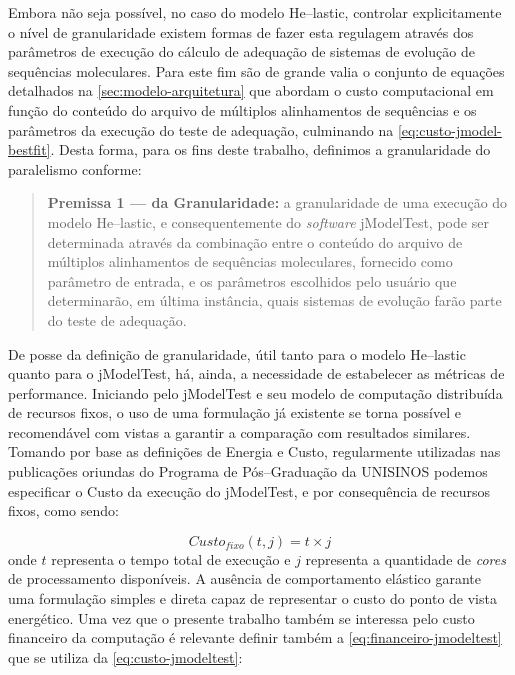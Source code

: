 \documentclass[english,brazilian]{UNISINOSmonografia} %
\begin{document}
Embora não seja possível, no caso do modelo \textsf{He}--lastic, controlar explicitamente o nível de granularidade existem formas de fazer esta regulagem através dos parâmetros de execução do cálculo de adequação de sistemas de evolução de sequências moleculares.
Para este fim são de grande valia o conjunto de equações detalhados na \autoref{sec:modelo-arquitetura} que abordam o custo computacional em função do conteúdo do arquivo de múltiplos alinhamentos de sequências e os parâmetros da execução do teste de adequação, culminando na \autoref{eq:custo-jmodel-bestfit}.
Desta forma, para os fins deste trabalho, definimos a granularidade do paralelismo conforme:
\begin{quote}
	\textbf{Premissa 1 --- da Granularidade:} a granularidade de uma execução do modelo \textsf{He}--lastic, e consequentemente do \textit{software} jModelTest, pode ser determinada através da combinação entre o conteúdo do arquivo de múltiplos alinhamentos de sequências moleculares, fornecido como parâmetro de entrada, e os parâmetros escolhidos pelo usuário que determinarão, em última instância, quais sistemas de evolução farão parte do teste de adequação.
\end{quote}



De posse da definição de granularidade, útil tanto para o modelo \textsf{He}--lastic quanto para o jModelTest, há, ainda, a necessidade de estabelecer as métricas de performance.
Iniciando pelo jModelTest e seu modelo de computação distribuída de recursos fixos, o uso de uma formulação já existente se torna possível e recomendável com vistas a garantir a comparação com resultados similares.
Tomando por base as definições de Energia e Custo, regularmente utilizadas nas publicações oriundas do Programa de Pós--Graduação da UNISINOS podemos especificar o Custo da execução do jModelTest, e por consequência de recursos fixos, como sendo:

\begin{equation}
\label{eq:custo-jmodeltest}
Custo_{fixo}(t,j) = t \times j
\end{equation}
onde $ t $ representa o tempo total de execução e $ j $ representa a quantidade de \textit{cores} de processamento disponíveis.
A ausência de comportamento elástico garante uma formulação simples e direta capaz de representar o custo do ponto de vista energético.
Uma vez que o presente trabalho também se interessa pelo custo financeiro da computação é relevante definir também a \autoref{eq:financeiro-jmodeltest} que se utiliza da \autoref{eq:custo-jmodeltest}:
\end{document}
